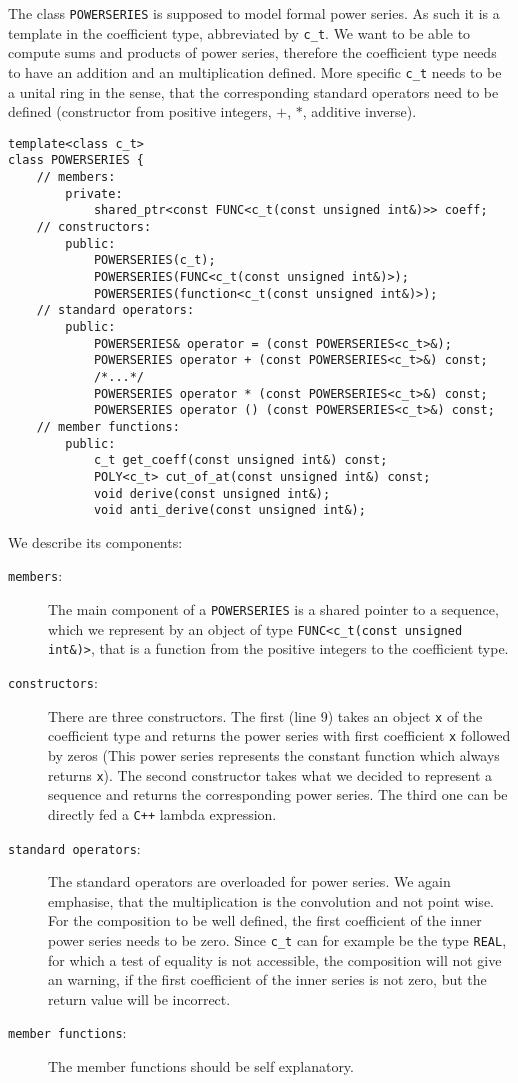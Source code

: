 \documentclass{article}
\newcommand{\cc}{\texttt{C++}\xspace}
\newcommand{\ir}[1]{\texttt{#1}}
\newcommand{\code}[1]{\texttt{#1}}
\newcommand{\func}[1]{\texttt{#1}}
\begin{document}
The class \func{POWERSERIES} is supposed to model formal power series. As such it is a template in the coefficient type, abbreviated by \code{c\_t}. We want to be able to compute sums and products of power series, therefore the coefficient type needs to have an addition and an multiplication defined. More specific \code{c\_t} needs to be a unital ring in the sense, that the corresponding standard operators need to be defined (constructor from positive integers, $+$, $*$, additive inverse). 
\begin{lstlisting}
template<class c_t>
class POWERSERIES {
	// members:
		private:
			shared_ptr<const FUNC<c_t(const unsigned int&)>> coeff;
	// constructors:
		public:
			POWERSERIES(c_t);
			POWERSERIES(FUNC<c_t(const unsigned int&)>);
			POWERSERIES(function<c_t(const unsigned int&)>);
	// standard operators:
		public:
			POWERSERIES& operator = (const POWERSERIES<c_t>&);
			POWERSERIES operator + (const POWERSERIES<c_t>&) const;
			/*...*/
			POWERSERIES operator * (const POWERSERIES<c_t>&) const;
			POWERSERIES operator () (const POWERSERIES<c_t>&) const; 
	// member functions:
		public:
			c_t get_coeff(const unsigned int&) const;
			POLY<c_t> cut_of_at(const unsigned int&) const;
			void derive(const unsigned int&);
			void anti_derive(const unsigned int&);	
\end{lstlisting}
We describe its components:
\begin{description}
\item[\code{members}:] The main component of a \func{POWERSERIES} is a shared pointer to a sequence, which we represent by an object of type \func{FUNC<c\_t(const unsigned int\&)>}, that is a function from the positive integers to the coefficient type.
\item[\code{constructors}:] There are three constructors. The first (line 9) takes an object \code{x} of the coefficient type and returns the power series with first coefficient \code{x} followed by zeros (This power series represents the constant function which always returns \code{x}). The second constructor takes what we decided to represent a sequence and returns the corresponding power series. The third one can be directly fed a \cc lambda expression.
\item[\code{standard operators}:] The standard operators are overloaded for power series. We again emphasise, that the multiplication is the convolution and not point wise. For the composition to be well defined, the first coefficient of the inner power series needs to be zero. Since \code{c\_t} can for example be the type \ir{REAL}, for which a test of equality is not accessible, the composition will not give an warning, if the first coefficient of the inner series is not zero, but the return value will be incorrect.
\item[\code{member functions}:] The member functions should be self explanatory.
\end{description}
\end{document}
